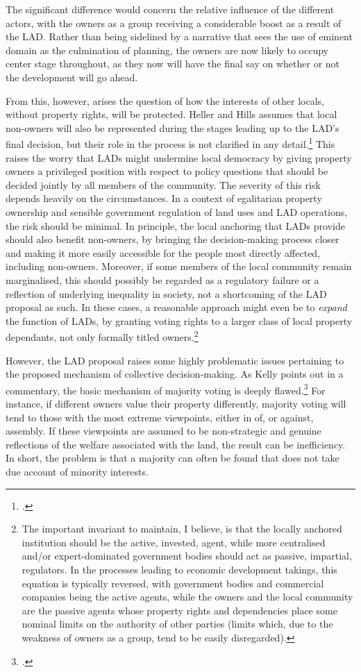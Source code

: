 The significant difference would concern the relative influence of the different actors, with the   owners as a group receiving a considerable boost as a result of the LAD. Rather than being sidelined by a narrative that sees the use of eminent domain as the culmination of planning, the owners are now likely to occupy center stage throughout, as they now will have the final say on whether or not the development will go ahead.

From this, however, arises the question of how the interests of other locals, without property rights, will be protected. Heller and Hills assumes that local non-owners will also be represented during the stages leading up to the LAD's final decision, but their role in the process is not clarified in any detail.\footcite[1490-1491]{heller08} This raises the worry that LADs might undermine local democracy by giving property owners a privileged position with respect to policy questions that should be decided jointly by all members of the community. The severity of this risk depends heavily on the circumstances. In a context of egalitarian property ownership and sensible government regulation of land uses and LAD operations, the risk should be minimal. In principle, the local anchoring that LADs provide should also benefit non-owners, by bringing the decision-making process closer and making it more easily accessible for the people most directly affected, including non-owners. Moreover, if some members of the local community remain marginalised, this should possibly be regarded as a regulatory failure or a reflection of underlying inequality in society, not a shortcoming of the LAD proposal as such. In these cases, a reasonable approach might even be to {\it expand} the function of LADs, by granting voting rights to a larger class of local property dependants, not only formally titled owners.\footnote{The important invariant to maintain, I believe, is that the locally anchored institution should be the active, invested, agent, while more centralised and/or expert-dominated government bodies should act as passive, impartial, regulators. In the processes leading to economic development takings, this equation is typically reversed, with government bodies and commercial companies being the active agents, while the owners and the local community are the passive agents whose property rights and dependencies place some nominal limits on the authority of other parties (limits which, due to the weakness of owners as a group, tend to be easily disregarded).}

However, the LAD proposal raises some highly problematic issues pertaining to the proposed mechanism of collective decision-making. As Kelly points out in a commentary, the basic mechanism of majority voting is deeply flawed.\footcite{kelly09} For instance, if different owners value their property differently, majority voting will tend to  those with the most extreme viewpoints, either in  of, or against, assembly. If these viewpoints are assumed to be non-strategic and genuine reflections of the welfare associated with the land, the result can be inefficiency. In short, the problem is that a majority can often be found that does not take due account of minority interests. 

